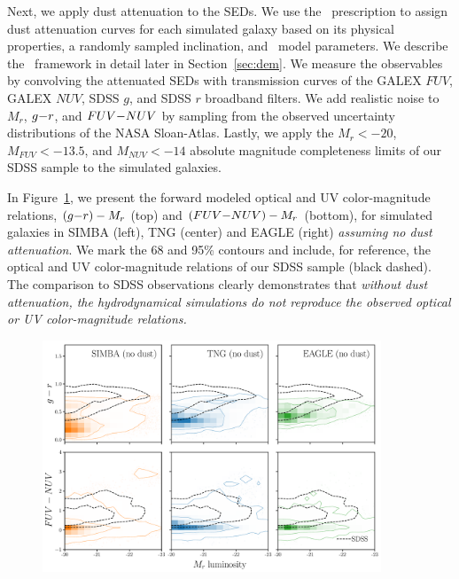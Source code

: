 Next, we apply dust attenuation to the SEDs. We use the \eda~prescription
to assign dust attenuation curves for each simulated galaxy based on its physical
properties, a randomly sampled inclination, and \eda~model parameters. We
describe the \eda~framework in detail later in Section~\ref{sec:dem}. We
measure the observables by convolving the attenuated SEDs with transmission
curves of the GALEX $FUV$, GALEX $NUV$, SDSS $g$, and SDSS $r$ broadband
filters. We add realistic noise to $M_r$, $g{-}r$, and $FUV{-}NUV$ by sampling
from the observed uncertainty distributions of the NASA Sloan-Atlas.
Lastly, we apply the $M_r < -20$, $M_{FUV} < -13.5$, and $M_{NUV} < -14$
absolute magnitude completeness limits of our SDSS sample to the simulated 
galaxies. 

In Figure~\ref{fig:obs}, we present the forward modeled optical and UV
color-magnitude relations, $(g{-}r)-M_r$ (top) and $(FUV{-}NUV)-M_r$ (bottom),
for simulated galaxies in SIMBA (left), TNG (center) and EAGLE (right)
\emph{assuming no dust attenuation}. We mark the 68 and 95\% contours and
include, for reference, the optical and UV color-magnitude relations of our
SDSS sample (black dashed). 
The comparison to SDSS observations clearly demonstrates
that {\em without dust attenuation, the hydrodynamical simulations do not
reproduce the observed optical or UV color-magnitude relations.}

\begin{figure}
\begin{center}
\includegraphics[width=0.9\textwidth]{figs/observables.pdf} 
    \caption{\label{fig:obs}
    }
\end{center}
\end{figure}
